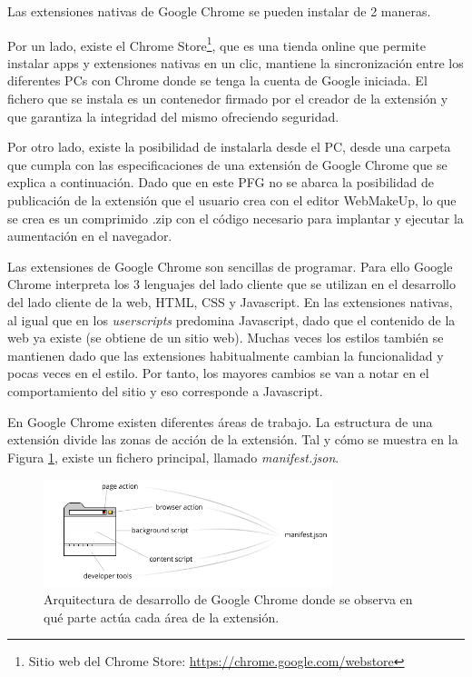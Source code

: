 Las extensiones nativas de Google Chrome se pueden instalar de 2 maneras.

Por un lado, existe el Chrome Store\footnote{Sitio web del Chrome Store: \url{https://chrome.google.com/webstore}}, que es una tienda online que permite instalar apps y extensiones nativas en un clic, mantiene la sincronización entre los diferentes PCs con Chrome donde se tenga la cuenta de Google iniciada. El fichero que se instala es un contenedor firmado por el creador de la extensión y que garantiza la integridad del mismo ofreciendo seguridad.

Por otro lado, existe la posibilidad de instalarla desde el PC, desde una carpeta que cumpla con las especificaciones de una extensión de Google Chrome que se explica a continuación. Dado que en este PFG no se abarca la posibilidad de publicación de la extensión que el usuario crea con el editor WebMakeUp, lo que se crea es un comprimido .zip con el código necesario para implantar y ejecutar la aumentación en el navegador.

Las extensiones de Google Chrome son sencillas de programar. Para ello Google Chrome interpreta los 3 lenguajes del lado cliente que se utilizan en el desarrollo del lado cliente de la web, HTML, CSS y Javascript. En las extensiones nativas, al igual que en los \emph{userscripts} predomina Javascript, dado que el contenido de la web ya existe (se obtiene de un sitio web). Muchas veces los estilos también se mantienen dado que las extensiones habitualmente cambian la funcionalidad y pocas veces en el estilo. Por tanto, los mayores cambios se van a notar en el comportamiento del sitio y eso corresponde a Javascript.

En Google Chrome existen diferentes áreas de trabajo. La estructura de una extensión divide las zonas de acción de la extensión. Tal y cómo se muestra en la Figura \ref{fig:arquitecturaChrome}, existe un fichero principal, llamado \emph{manifest.json}.

\begin{figure}
\begin{center}
\includegraphics[width=0.75\textwidth]{figs/5-chromeArchitecture.png}
\caption{Arquitectura de desarrollo de Google Chrome donde se observa en qué parte actúa cada área de la extensión.}
\label{fig:arquitecturaChrome}
\end{center}
\end{figure}

